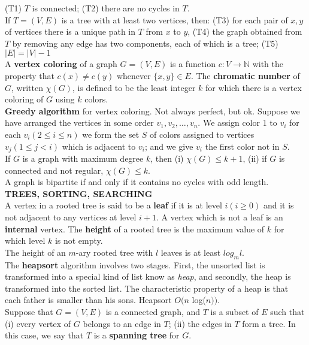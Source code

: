 \documentclass[10pt,landscape]{article}
\begin{document}
\begin{multicols}{4}
(T1) $T$ is connected; (T2) there are no cycles in $T$.\\
If $T = (V,E)$ is a tree with at least two vertices, then: (T3) for
each pair of $x,y$ of vertices there is a unique path in $T$ from $x$
to $y$, (T4) the graph obtained from $T$ by removing any edge has two
components, each of which is a tree; (T5) $|E| = |V|-1$\\
A \textbf{vertex coloring} of a graph $G = (V,E)$ is a function $c: V
\to \mathbb{N}$ with the property that $c(x) \neq c(y)$ whenever
$\{x,y\} \in E$. The \textbf{chromatic number} of $G$, written
$\chi(G)$, is defined to be the least integer $k$ for which there is a
vertex coloring of $G$ using $k$ colors.\\
\textbf{Greedy algorithm} for vertex coloring. Not always perfect, but
ok. Suppose we have arranged the vertices in some order $v_{1}, v_{2},
\dots ,v_{n}$. We assign color 1 to $v_{i}$ for each $v_{i}(2 \leq i
\leq n)$ we form the set $S$ of colors assigned to vertices $v_{j}(1
\leq j < i)$ which is adjacent to $v_{i}$; and we give $v_{i}$ the
first color not in $S$.\\
If $G$ is a graph with maximum degree $k$, then (i) $\chi(G) \leq k +
1$, (ii) if $G$ is connected and not regular, $\chi(G) \leq k$.\\
A graph is bipartite if and only if it contains no cycles with odd length.\\
\textbf{TREES, SORTING, SEARCHING}\\
A vertex in a rooted tree is said to be a \textbf{leaf} if it is at
level $i (i \geq 0)$ and it is not adjacent to any vertices at level
$i + 1$. A vertex which is not a leaf is an \textbf{internal}
vertex. The \textbf{height} of a rooted tree is the maximum value of
$k$ for which level $k$ is not empty.\\
The height of an $m$-ary rooted tree with $l$ leaves is at least
$log_{m}l$.\\
The \textbf{heapsort} algorithm involves two stages. First, the
unsorted list is transformed into a special kind of list know as
\textit{heap}, and secondly, the heap is transformed into the sorted
list. The characteristic property of a heap is that each father is
smaller than his sons. Heapsort $O(n$ log($n))$.\\
Suppose that $G = (V, E)$ is a connected graph, and $T$ is a subset of
$E$ such that (i) every vertex of $G$ belongs to an edge in $T$; (ii)
the edges in $T$ form a tree. In this case, we say that $T$ is a
\textbf{spanning tree} for $G$.\\

\end{multicols}
\end{document}

